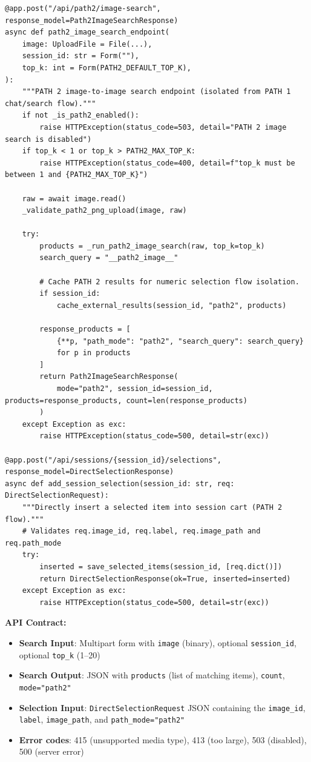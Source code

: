 \begin{lstlisting}[caption={FastAPI PATH 2 Endpoints --- api/main.py}]
@app.post("/api/path2/image-search", response_model=Path2ImageSearchResponse)
async def path2_image_search_endpoint(
    image: UploadFile = File(...),
    session_id: str = Form(""),
    top_k: int = Form(PATH2_DEFAULT_TOP_K),
):
    """PATH 2 image-to-image search endpoint (isolated from PATH 1 chat/search flow)."""
    if not _is_path2_enabled():
        raise HTTPException(status_code=503, detail="PATH 2 image search is disabled")
    if top_k < 1 or top_k > PATH2_MAX_TOP_K:
        raise HTTPException(status_code=400, detail=f"top_k must be between 1 and {PATH2_MAX_TOP_K}")

    raw = await image.read()
    _validate_path2_png_upload(image, raw)

    try:
        products = _run_path2_image_search(raw, top_k=top_k)
        search_query = "__path2_image__"

        # Cache PATH 2 results for numeric selection flow isolation.
        if session_id:
            cache_external_results(session_id, "path2", products)

        response_products = [
            {**p, "path_mode": "path2", "search_query": search_query}
            for p in products
        ]
        return Path2ImageSearchResponse(
            mode="path2", session_id=session_id, products=response_products, count=len(response_products)
        )
    except Exception as exc:
        raise HTTPException(status_code=500, detail=str(exc))

@app.post("/api/sessions/{session_id}/selections", response_model=DirectSelectionResponse)
async def add_session_selection(session_id: str, req: DirectSelectionRequest):
    """Directly insert a selected item into session cart (PATH 2 flow)."""
    # Validates req.image_id, req.label, req.image_path and req.path_mode
    try:
        inserted = save_selected_items(session_id, [req.dict()])
        return DirectSelectionResponse(ok=True, inserted=inserted)
    except Exception as exc:
        raise HTTPException(status_code=500, detail=str(exc))
\end{lstlisting}

\textbf{API Contract:}
\begin{itemize}
    \item \textbf{Search Input}: Multipart form with \texttt{image} (binary), optional \texttt{session\_id}, optional \texttt{top\_k} (1--20)
    \item \textbf{Search Output}: JSON with \texttt{products} (list of matching items), \texttt{count}, \texttt{mode="path2"}
    \item \textbf{Selection Input}: \texttt{DirectSelectionRequest} JSON containing the \texttt{image\_id}, \texttt{label}, \texttt{image\_path}, and \texttt{path\_mode="path2"}
    \item \textbf{Error codes}: 415 (unsupported media type), 413 (too large), 503 (disabled), 500 (server error)
\end{itemize}

